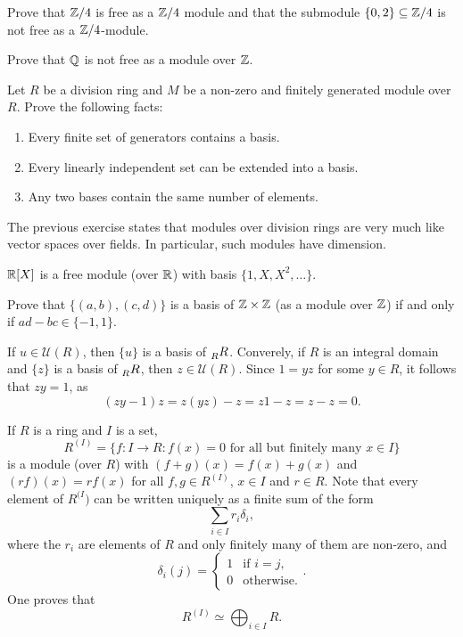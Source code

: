 \begin{exercise}
    Prove that $\mathbb{Z}/4$ is free as a $\mathbb{Z}/4$ module and that the submodule 
    $\{0,2\}\subseteq \mathbb{Z}/4$ is not free as a $\mathbb{Z}/4$-module.
\end{exercise}
\begin{exercise}
    Prove that $\mathbb{Q}$ is not free as a module over $\mathbb{Z}$. 
\end{exercise}

\begin{exercise}
\label{xca:linear_algebra}
    Let $R$ be a division ring and $M$ be a non-zero and finitely generated module over $R$.
    Prove the following facts:
    \begin{enumerate}
        \item Every finite set of generators contains a basis.
        \item Every linearly independent set can be extended into a basis.
        \item Any two bases contain the same number of elements.
    \end{enumerate}
\end{exercise}

The previous exercise states that modules over division rings 
are very much like vector spaces over fields. In particular, 
such modules have dimension.

\begin{example}
    $\mathbb{R}[X]$ is a free module (over $\mathbb{R}$) with basis $\{1,X,X^2,\dots\}$. 
\end{example}

\begin{exercise}
    Prove that $\{(a,b),(c,d)\}$ is a basis of $\mathbb{Z}\times\mathbb{Z}$ 
    (as a module over $\mathbb{Z}$) if and only if
    $ad-bc\in\{-1,1\}$. 
\end{exercise}

\begin{example}
If $u\in\mathcal{U}(R)$, then $\{u\}$ is a basis of $\prescript{}{R}R$. Converely, if $R$ is an integral domain and 
$\{z\}$ is a basis of $\prescript{}{R}R$, then $z\in\mathcal{U}(R)$. Since 
$1=yz$ for some $y\in R$, it follows that $zy=1$, as  
\[
(zy-1)z=z(yz)-z=z1-z=z-z=0.
\]	
\end{example}

If $R$ is a ring and $I$ is a set, 
\[
R^{(I)}=\{f\colon I\to R:f(x)=0\text{ for all but finitely many $x\in I$}\}
\]
is a module (over $R$) with 
$(f+g)(x)=f(x)+g(x)$ and $(rf)(x)=rf(x)$ for all $f,g\in R^{(I)}$, $x\in I$ and $r\in R$. 
Note that 
every element 
of $R^{(I})$ can be written uniquely as
a finite sum of the form 
\[
\sum_{i\in I}r_i\delta_i,
\]
where the $r_i$ are elements of $R$ and only finitely many of them are non-zero, and 
\[
\delta_i(j)=\begin{cases}
1 & \text{if $i=j$},\\
0 & \text{otherwise}.
\end{cases}.
\]
One proves
that
\[
R^{(I)}\simeq\bigoplus_{i\in I}R.
\]

